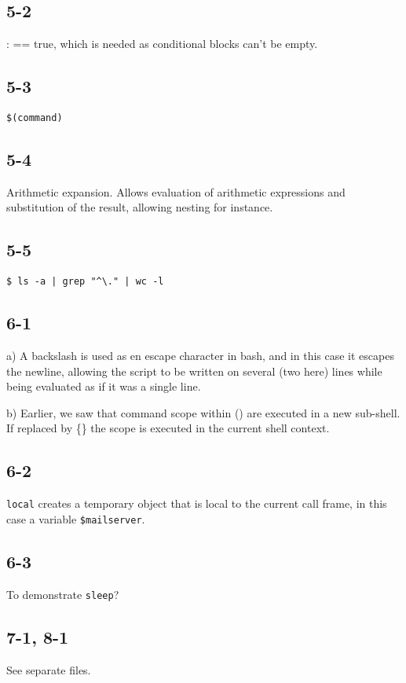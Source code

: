 \subsection{5-2}
: == true, which is needed as conditional blocks can't be empty.

\subsection{5-3}
\verb=$(command)=

\subsection{5-4}
Arithmetic expansion. Allows evaluation of arithmetic expressions and substitution of the result, allowing nesting for instance.

\subsection{5-5}

\verb=$ ls -a | grep "^\." | wc -l=

\subsection{6-1}
a) A backslash is used as en escape character in bash, and in this case it escapes the newline, allowing the script to be written on several (two here) lines while being evaluated as if it was a single line.

b) Earlier, we saw that command scope within () are executed in a new sub-shell. If replaced by \{\} the scope is executed in the current shell context.

\subsection{6-2}
\verb=local= creates a temporary object that is local to the current call frame, in this case a variable \verb=$mailserver=.

\subsection{6-3}
To demonstrate \verb=sleep=?

\subsection{7-1, 8-1}

See separate files.
